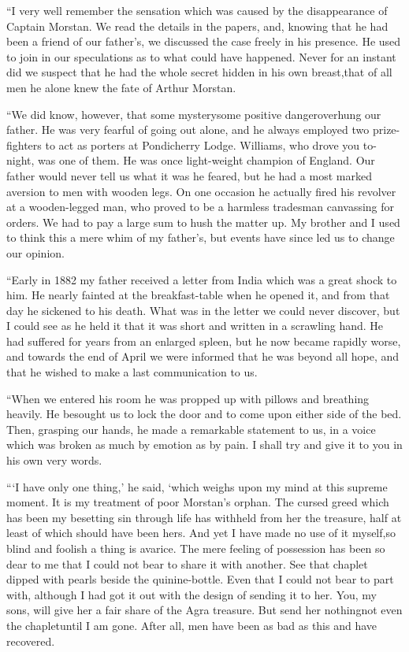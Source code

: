 \documentclass[12pt,english,oneside]{book}
\begin{document}
{}``I very well remember the sensation which was caused by the disappearance
of Captain Morstan. We read the details in the papers, and, knowing
that he had been a friend of our father's, we discussed the case freely
in his presence. He used to join in our speculations as to what could
have happened. Never for an instant did we suspect that he had the
whole secret hidden in his own breast,\mdsh{---}that of all men he
alone knew the fate of Arthur Morstan.

{}``We did know, however, that some mystery\mdsh{---}some positive
danger\mdsh{---}overhung our father. He was very fearful of going
out alone, and he always employed two prize-fighters to act as porters
at Pondicherry Lodge. Williams, who drove you to-night, was one of
them. He was once light-weight champion of England. Our father would
never tell us what it was he feared, but he had a most marked aversion
to men with wooden legs. On one occasion he actually fired his revolver
at a wooden-legged man, who proved to be a harmless tradesman canvassing
for orders. We had to pay a large sum to hush the matter up. My brother
and I used to think this a mere whim of my father's, but events have
since led us to change our opinion.

{}``Early in 1882 my father received a letter from India which was
a great shock to him. He nearly fainted at the breakfast-table when
he opened it, and from that day he sickened to his death. What was
in the letter we could never discover, but I could see as he held
it that it was short and written in a scrawling hand. He had suffered
for years from an enlarged spleen, but he now became rapidly worse,
and towards the end of April we were informed that he was beyond all
hope, and that he wished to make a last communication to us.

{}``When we entered his room he was propped up with pillows and breathing
heavily. He besought us to lock the door and to come upon either side
of the bed. Then, grasping our hands, he made a remarkable statement
to us, in a voice which was broken as much by emotion as by pain.
I shall try and give it to you in his own very words.

{}```I have only one thing,' he said, `which weighs upon my mind
at this supreme moment. It is my treatment of poor Morstan's orphan.
The cursed greed which has been my besetting sin through life has
withheld from her the treasure, half at least of which should have
been hers. And yet I have made no use of it myself,\mdsh{---}so blind
and foolish a thing is avarice. The mere feeling of possession has
been so dear to me that I could not bear to share it with another.
See that chaplet dipped with pearls beside the quinine-bottle. Even
that I could not bear to part with, although I had got it out with
the design of sending it to her. You, my sons, will give her a fair
share of the Agra treasure. But send her nothing\mdsh{---}not even
the chaplet\mdsh{---}until I am gone. After all, men have been as
bad as this and have recovered.
\end{document}
